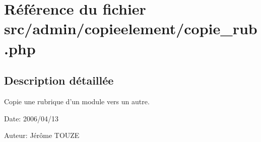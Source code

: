 \section{Référence du fichier src/admin/copieelement/copie\_\-rub.php}
\label{copie__rub_8php}


\subsection{Description détaillée}
Copie une rubrique d'un module vers un autre. 

\begin{Desc}
\item[Date:]2006/04/13\end{Desc}
\begin{Desc}
\item[Auteur:]Jérôme TOUZE \end{Desc}


